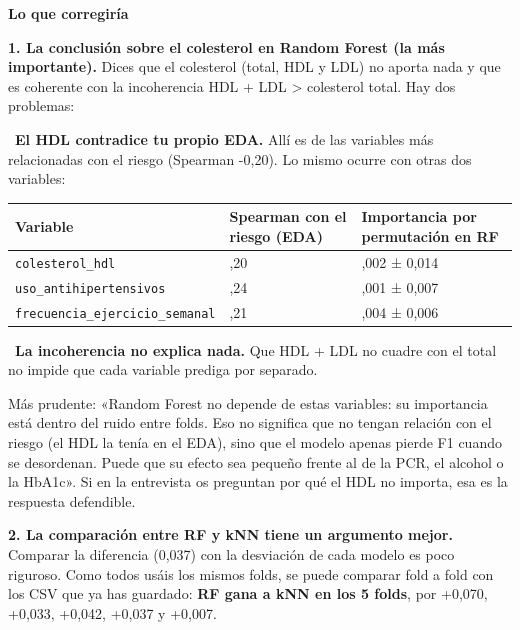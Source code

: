 \documentclass[11pt,a4paper]{article}
\begin{document}
{\smallskip\noindent\textbf{Lo que corregiría}\par
\textbf{1. La conclusión sobre el colesterol en Random Forest (la más importante).} Dices que el colesterol (total, HDL y LDL) no aporta nada y que es coherente con la incoherencia HDL + LDL \textgreater{} colesterol total. Hay dos problemas:

\hspace*{1.0em}\textbullet~\textbf{El HDL contradice tu propio EDA.} Allí es de las variables más relacionadas con el riesgo (Spearman -0,20). Lo mismo ocurre con otras dos variables:

{\footnotesize\noindent\begin{tabularx}{\linewidth}{>{\raggedright\arraybackslash}X>{\raggedright\arraybackslash}X>{\raggedright\arraybackslash}X}
\toprule
\textbf{Variable} & \textbf{Spearman con el riesgo (EDA)} & \textbf{Importancia por permutación en RF} \\
\midrule
\texttt{colesterol\_\allowbreak{}hdl} & -0,20 & 0,002 ± 0,014 \\
\texttt{uso\_\allowbreak{}antihipertensivos} & 0,24 & 0,001 ± 0,007 \\
\texttt{frecuencia\_\allowbreak{}ejercicio\_\allowbreak{}semanal} & -0,21 & 0,004 ± 0,006 \\
\bottomrule
\end{tabularx}}

\hspace*{1.0em}\textbullet~\textbf{La incoherencia no explica nada.} Que HDL + LDL no cuadre con el total no impide que cada variable prediga por separado.

Más prudente: «Random Forest no depende de estas variables: su importancia está dentro del ruido entre folds. Eso no significa que no tengan relación con el riesgo (el HDL la tenía en el EDA), sino que el modelo apenas pierde F1 cuando se desordenan. Puede que su efecto sea pequeño frente al de la PCR, el alcohol o la HbA1c». Si en la entrevista os preguntan por qué el HDL no importa, esa es la respuesta defendible.

\textbf{2. La comparación entre RF y kNN tiene un argumento mejor.} Comparar la diferencia (0,037) con la desviación de cada modelo es poco riguroso. Como todos usáis los mismos folds, se puede comparar fold a fold con los CSV que ya has guardado: \textbf{RF gana a kNN en los 5 folds}, por +0,070, +0,033, +0,042, +0,037 y +0,007.

}
\end{document}
